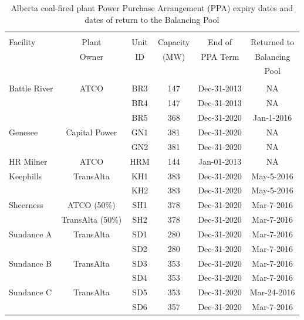 \documentclass[12pt]{article}
\begin{document}
\renewcommand{\arraystretch}{.85}
\begin{table}[!h]
\vspace{.5cm}
\caption{Alberta coal-fired plant Power Purchase Arrangement (PPA) expiry dates and dates of return to the Balancing Pool}\label{tab:PPA}
\begin{tabular}{lccccc}
  \hline\\[-1.75ex]
Facility&Plant&Unit& Capacity& End of& Returned to\\
&Owner&         ID   &  (MW) &  PPA Term &Balancing\\
&&                 &    &      & Pool\\[+0.5ex]
\hline \\[-1.5ex]
Battle River& ATCO& BR3 &147& Dec-31-2013&NA\\
&&BR4 &147& Dec-31-2013&NA\\
&&BR5 &368& Dec-31-2020&Jan-1-2016\\[+0.75ex]
Genesee &Capital Power &GN1 &381 &Dec-31-2020&NA\\
&&GN2 &381 &Dec-31-2020&NA\\[+0.75ex]
HR Milner &ATCO& HRM& 144& Jan-01-2013&NA\\[+0.75ex]
Keephills& TransAlta & KH1 &383& Dec-31-2020&May-5-2016\\
&&KH2& 383& Dec-31-2020&May-5-2016\\[+0.75ex]
Sheerness &ATCO (50\%) & SH1& 378& Dec-31-2020&Mar-7-2016\\
&TransAlta (50\%)&SH2& 378& Dec-31-2020&Mar-7-2016\\[+0.75ex]
Sundance A &TransAlta&  SD1 &280& Dec-31-2020&Mar-7-2016\\
&&SD2 &280& Dec-31-2020&Mar-7-2016\\[+0.75ex]
Sundance B &TransAlta & SD3& 353& Dec-31-2020&Mar-7-2016\\
&&SD4 &353 &Dec-31-2020&Mar-7-2016\\[+0.75ex]
Sundance C &TransAlta& SD5& 353& Dec-31-2020&Mar-24-2016\\
&&SD6& 357& Dec-31-2020&Mar-7-2016\\[+0.75ex]
  \hline
\end{tabular}
\end{table}
\end{document}

